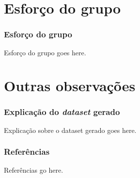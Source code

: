 \documentclass{beamer}
\begin{document}
\section{Esforço do grupo}

\begin{frame}
\frametitle{Esforço do grupo}
Esforço do grupo goes here.
\end{frame}








\section{Outras observações}

\begin{frame}
\frametitle{Explicação do \textit{dataset} gerado}
Explicação sobre o dataset gerado goes here.
\end{frame}

\begin{frame}
\frametitle{Referências}
Referências go here.
\end{frame}


\end{document}

